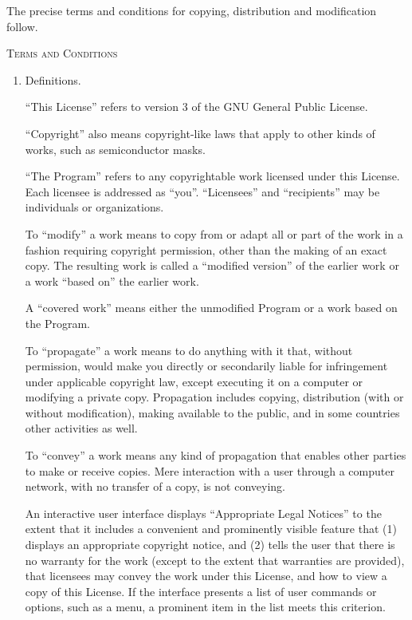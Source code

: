 	The precise terms and conditions for copying, distribution and
	modification follow.

\begin{center}
	{\Large \textsc{Terms and Conditions}}
\end{center}


\begin{enumerate}
	
	\addtocounter{enumi}{-1}
	
	\item Definitions.
	
	``This License'' refers to version 3 of the GNU General Public License.
	
	``Copyright'' also means copyright-like laws that apply to other kinds of
	works, such as semiconductor masks.
	
	``The Program'' refers to any copyrightable work licensed under this
	License.  Each licensee is addressed as ``you''.  ``Licensees'' and
	``recipients'' may be individuals or organizations.
	
	To ``modify'' a work means to copy from or adapt all or part of the work
	in a fashion requiring copyright permission, other than the making of an
	exact copy.  The resulting work is called a ``modified version'' of the
	earlier work or a work ``based on'' the earlier work.
	
	A ``covered work'' means either the unmodified Program or a work based
	on the Program.
	
	To ``propagate'' a work means to do anything with it that, without
	permission, would make you directly or secondarily liable for
	infringement under applicable copyright law, except executing it on a
	computer or modifying a private copy.  Propagation includes copying,
	distribution (with or without modification), making available to the
	public, and in some countries other activities as well.
	
	To ``convey'' a work means any kind of propagation that enables other
	parties to make or receive copies.  Mere interaction with a user through
	a computer network, with no transfer of a copy, is not conveying.
	
	An interactive user interface displays ``Appropriate Legal Notices''
	to the extent that it includes a convenient and prominently visible
	feature that (1) displays an appropriate copyright notice, and (2)
	tells the user that there is no warranty for the work (except to the
	extent that warranties are provided), that licensees may convey the
	work under this License, and how to view a copy of this License.  If
	the interface presents a list of user commands or options, such as a
	menu, a prominent item in the list meets this criterion.
	

\end{enumerate}
